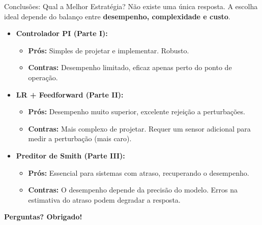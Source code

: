 \documentclass{beamer}
\begin{document}
\begin{frame}[allowframebreaks]{Conclusões: Qual a Melhor Estratégia?}
    \large Não existe uma única resposta. A escolha ideal depende do balanço entre \textbf{desempenho, complexidade e custo}.
    
    \vspace{1em}
    
    \begin{itemize}
        \item \textbf{Controlador PI (Parte I):}
        \begin{itemize}
            \item \small \textbf{Prós:} Simples de projetar e implementar. Robusto.
            \item \small \textbf{Contras:} Desempenho limitado, eficaz apenas perto do ponto de operação.
        \end{itemize}
        
        \vspace{0.5em}
        
        \item \textbf{LR + Feedforward (Parte II):}
        \begin{itemize}
            \item \small \textbf{Prós:} Desempenho muito superior, excelente rejeição a perturbações.
            \item \small \textbf{Contras:} Mais complexo de projetar. Requer um sensor adicional para medir a perturbação (mais caro).
        \end{itemize}
        
        \vspace{0.5em}
        
        \item \textbf{Preditor de Smith (Parte III):}
        \begin{itemize}
            \item \small \textbf{Prós:} Essencial para sistemas com atraso, recuperando o desempenho.
            \item \small \textbf{Contras:} O desempenho depende da precisão do modelo. Erros na estimativa do atraso podem degradar a resposta.
        \end{itemize}
    \end{itemize}
    
\end{frame}

\begin{frame}
    \centering
    \Huge\bfseries Perguntas?
    \vspace{2em}
    \large Obrigado!
\end{frame}
\end{document}

